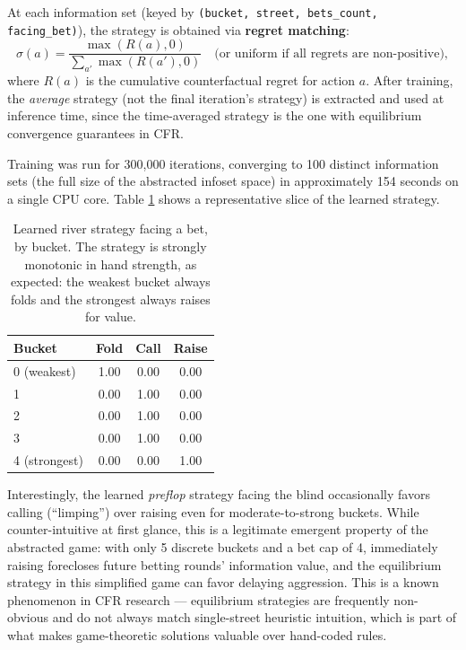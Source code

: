 \documentclass[11pt]{article}
\begin{document}
At each information set (keyed by \texttt{(bucket, street, bets\_count,
facing\_bet)}), the strategy is obtained via \textbf{regret matching}:
\[
    \sigma(a) = \frac{\max(R(a), 0)}{\sum_{a'} \max(R(a'), 0)}
    \quad \text{(or uniform if all regrets are non-positive)},
\]
where $R(a)$ is the cumulative counterfactual regret for action $a$. After
training, the \emph{average} strategy (not the final iteration's strategy)
is extracted and used at inference time, since the time-averaged strategy is
the one with equilibrium convergence guarantees in CFR.

Training was run for 300{,}000 iterations, converging to 100 distinct
information sets (the full size of the abstracted infoset space) in
approximately 154 seconds on a single CPU core. Table
\ref{tab:strategy-sample} shows a representative slice of the learned
strategy.

\begin{table}[h]
\centering
\begin{tabular}{lccc}
\toprule
Bucket & Fold & Call & Raise \\
\midrule
0 (weakest) & 1.00 & 0.00 & 0.00 \\
1 & 0.00 & 1.00 & 0.00 \\
2 & 0.00 & 1.00 & 0.00 \\
3 & 0.00 & 1.00 & 0.00 \\
4 (strongest) & 0.00 & 0.00 & 1.00 \\
\bottomrule
\end{tabular}
\caption{Learned river strategy facing a bet, by bucket. The strategy is
strongly monotonic in hand strength, as expected: the weakest bucket always
folds and the strongest always raises for value.}
\label{tab:strategy-sample}
\end{table}

Interestingly, the learned \emph{preflop} strategy facing the blind
occasionally favors calling (``limping'') over raising even for
moderate-to-strong buckets. While counter-intuitive at first glance, this is
a legitimate emergent property of the abstracted game: with only 5 discrete
buckets and a bet cap of 4, immediately raising forecloses future betting
rounds' information value, and the equilibrium strategy in this simplified
game can favor delaying aggression. This is a known phenomenon in CFR
research --- equilibrium strategies are frequently non-obvious and do not
always match single-street heuristic intuition, which is part of what makes
game-theoretic solutions valuable over hand-coded rules.
\end{document}
